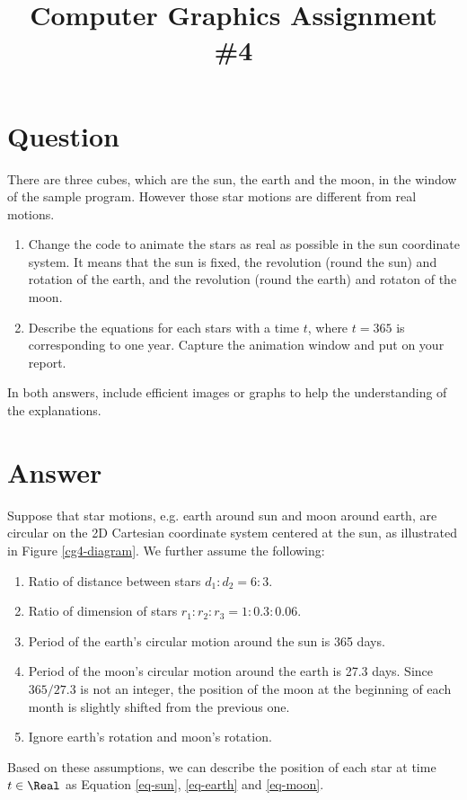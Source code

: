 

\usepackage{subfiles}
\usepackage{subcaption}
\usepackage{tikz}
\title{Computer Graphics Assignment \#4}

\section{Question}
There are three cubes, which are the sun, the earth and the moon, in the window of the sample program. However those star motions are different from real motions.
\begin{enumerate}
    \item Change the code to animate the stars as real as possible in the sun coordinate system. It means that the sun is fixed, the revolution (round the sun) and rotation of the earth, and the revolution (round the earth) and rotaton of the moon.
    \item Describe the equations for each stars with a time $t$, where $t = 365$ is corresponding to one year. Capture the animation window and put on your report.
\end{enumerate}
In both answers, include efficient images or graphs to help the understanding of the explanations.

\section{Answer}

Suppose that star motions, e.g. earth around sun and moon around earth, are circular on the 2D Cartesian coordinate system centered at the sun, as illustrated in Figure \ref{cg4-diagram}. We further assume the following:
\begin{enumerate}
    \item Ratio of distance between stars $d_1:d_2 = 6:3$.
    \item Ratio of dimension of stars $r_1:r_2:r_3 = 1:0.3:0.06$.
    \item Period of the earth's circular motion around the sun is 365 days.
    \item Period of the moon's circular motion around the earth is 27.3 days. Since $365 / 27.3$ is not an integer, the position of the moon at the beginning of each month is slightly shifted from the previous one.
    \item Ignore earth's rotation and moon's rotation.
\end{enumerate}

Based on these assumptions, we can describe the position of each star at time $t \in \Real$ as Equation \eqref{eq-sun}, \eqref{eq-earth} and \eqref{eq-moon}.

